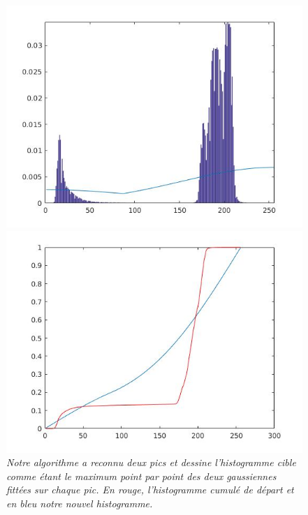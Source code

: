 \documentclass{article}
\begin{document}
\begin{figure}
\centering
\begin{minipage}{0.5\textwidth}
\includegraphics[scale=0.45]{images/birds_tmr_hist.jpg}
\end{minipage}%
\begin{minipage}{0.5\textwidth}
\includegraphics[scale=0.45]{images/cum_hist_bird.jpg}
\end{minipage}

\caption{\textit{Notre algorithme a reconnu deux pics et dessine l'histogramme cible comme étant le maximum point par point des deux gaussiennes fittées sur chaque pic. En rouge, l'histogramme cumulé de départ et en bleu notre nouvel histogramme.}}
\label{fig:choosehs}
\end{figure}
\FloatBarrier
\end{document}
